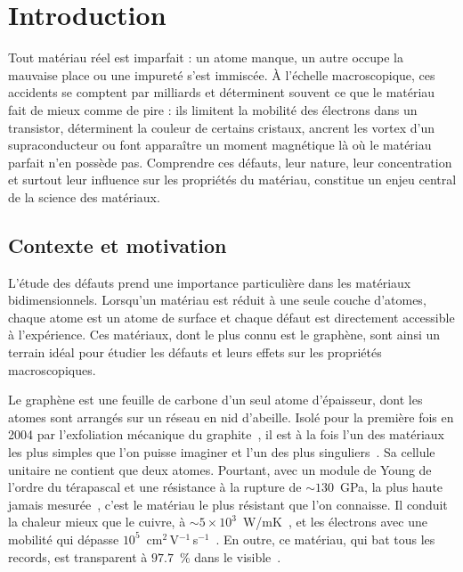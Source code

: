 \chapter{Introduction}\label{chap:introduction}

Tout matériau réel est imparfait : un atome manque, un autre occupe la mauvaise place ou une impureté s'est immiscée. À l'échelle macroscopique, ces accidents se comptent par milliards et déterminent souvent ce que le matériau fait de mieux comme de pire : ils limitent la mobilité des électrons dans un transistor, déterminent la couleur de certains cristaux, ancrent les vortex d'un supraconducteur ou font apparaître un moment magnétique là où le matériau parfait n'en possède pas. Comprendre ces défauts, leur nature, leur concentration et surtout leur influence sur les propriétés du matériau, constitue un enjeu central de la science des matériaux.

\section{Contexte et motivation}
\label{sec:contexte}

L'étude des défauts prend une importance particulière dans les matériaux bidimensionnels. Lorsqu'un matériau est réduit à une seule couche d'atomes, chaque atome est un atome de surface et chaque défaut est directement accessible à l'expérience. Ces matériaux, dont le plus connu est le graphène, sont ainsi un terrain idéal pour étudier les défauts et leurs effets sur les propriétés macroscopiques.


Le graphène est une feuille de carbone d'un seul atome d'épaisseur, dont les atomes sont arrangés sur un réseau en nid d'abeille. Isolé pour la première fois en 2004 par l'exfoliation mécanique du
graphite~\cite{novoselovElectricFieldEffect2004}, il est à la fois l'un des matériaux les plus simples que l'on puisse imaginer et l'un des plus singuliers~\cite{geimRiseGraphene2007}. Sa cellule unitaire ne contient que deux atomes. Pourtant, avec un module de Young de l'ordre du térapascal et une résistance à la rupture de $\sim 130$~GPa, la plus haute jamais mesurée~\cite{leeMeasurementElasticProperties2008}, c'est le matériau le plus résistant que l'on connaisse. Il conduit la chaleur mieux que le cuivre, à $\sim 5 \times 10^{3}$~W/mK~\cite{balandinSuperiorThermalConductivity2008}, et les électrons avec une mobilité qui dépasse $10^{5}$~cm$^{2}$\,V$^{-1}$\,s$^{-1}$~\cite{bolotinUltrahighElectronMobility2008}. En outre, ce matériau, qui bat tous les records, est transparent à $97.7$~\% dans le visible~\cite{nairFineStructureConstant2008}.

